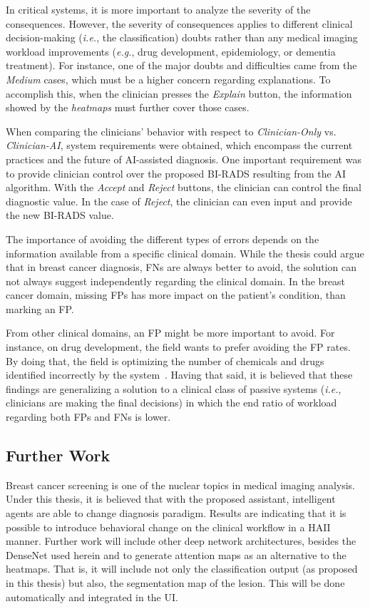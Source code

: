 In critical systems, it is more important to analyze the severity of the consequences.
However, the severity of consequences applies to different clinical decision-making ({\it i.e.}, the classification) doubts rather than any medical imaging workload improvements ({\it e.g.}, drug development, epidemiology, or dementia treatment).
For instance, one of the major doubts and difficulties came from the {\it Medium} cases, which must be a higher concern regarding explanations.
To accomplish this, when the clinician presses the {\it Explain} button, the information showed by the {\it heatmaps} must further cover those cases.

When comparing the clinicians' behavior with respect to {\it Clinician-Only} vs. {\it Clinician-AI}, system requirements were obtained, which encompass the current practices and the future of \ac{AI}-assisted diagnosis.
One important requirement was to provide clinician control over the proposed \ac{BI-RADS} resulting from the \ac{AI} algorithm.
With the {\it Accept} and {\it Reject} buttons, the clinician can control the final diagnostic value.
In the case of {\it Reject}, the clinician can even input and provide the new \ac{BI-RADS} value.

The importance of avoiding the different types of errors depends on the information available from a specific clinical domain.
While the thesis could argue that in breast cancer diagnosis, \acp{FN} are always better to avoid, the solution can not always suggest independently regarding the clinical domain.
In the breast cancer domain, missing \acp{FP} has more impact on the patient's condition, than marking an \ac{FP}.

From other clinical domains, an \ac{FP} might be more important to avoid.
For instance, on drug development, the field wants to prefer avoiding the \ac{FP} rates.
By doing that, the field is optimizing the number of chemicals and drugs identified incorrectly by the system~\cite{raja2017machine}.
Having that said, it is believed that these findings are generalizing a solution to a clinical class of passive systems ({\it i.e.}, clinicians are making the final decisions) in which the end ratio of workload regarding both \acp{FP} and \acp{FN} is lower.

\subsection{Further Work}
\label{sec:app003005004}

Breast cancer screening is one of the nuclear topics in medical imaging analysis.
Under this thesis, it is believed that with the proposed assistant, intelligent agents are able to change diagnosis paradigm.
Results are indicating that it is possible to introduce behavioral change on the clinical workflow in a \ac{HAII} manner.
Further work will include other deep network architectures, besides the DenseNet used herein and to generate attention maps as an alternative to the heatmaps.
That is, it will include not only the classification output (as proposed in this thesis) but also, the segmentation map of the lesion.
This will be done automatically and integrated in the \ac{UI}.

